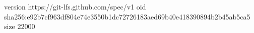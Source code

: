 version https://git-lfs.github.com/spec/v1
oid sha256:e92b7cf963df804e74e3550b1dc72726183aed69b40e418390894b2b45ab5ca5
size 22000
